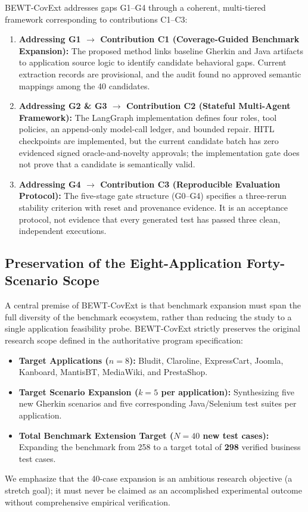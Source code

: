 \documentclass[pdflatex,sn-mathphys-num]{sn-jnl}
\begin{document}
BEWT-CovExt addresses gaps G1--G4 through a coherent, multi-tiered framework corresponding to contributions C1--C3:
\begin{enumerate}
    \item \textbf{Addressing G1 $\rightarrow$ Contribution C1 (Coverage-Guided Benchmark Expansion):} The proposed method links baseline Gherkin and Java artifacts to application source logic to identify candidate behavioral gaps. Current extraction records are provisional, and the audit found no approved semantic mappings among the 40 candidates.
    \item \textbf{Addressing G2 \& G3 $\rightarrow$ Contribution C2 (Stateful Multi-Agent Framework):} The LangGraph implementation defines four roles, tool policies, an append-only model-call ledger, and bounded repair. HITL checkpoints are implemented, but the current candidate batch has zero evidenced signed oracle-and-novelty approvals; the implementation gate does not prove that a candidate is semantically valid.
    \item \textbf{Addressing G4 $\rightarrow$ Contribution C3 (Reproducible Evaluation Protocol):} The five-stage gate structure (G0--G4) specifies a three-rerun stability criterion with reset and provenance evidence. It is an acceptance protocol, not evidence that every generated test has passed three clean, independent executions.
\end{enumerate}

\subsection{Preservation of the Eight-Application Forty-Scenario Scope}

A central premise of BEWT-CovExt is that benchmark expansion must span the full diversity of the benchmark ecosystem, rather than reducing the study to a single application feasibility probe. BEWT-CovExt strictly preserves the original research scope defined in the authoritative program specification:
\begin{itemize}
    \item \textbf{Target Applications ($n=8$):} Bludit, Claroline, ExpressCart, Joomla, Kanboard, MantisBT, MediaWiki, and PrestaShop.
    \item \textbf{Target Scenario Expansion ($k=5$ per application):} Synthesizing five new Gherkin scenarios and five corresponding Java/Selenium test suites per application.
    \item \textbf{Total Benchmark Extension Target ($N=40$ new test cases):} Expanding the benchmark from 258 to a target total of \textbf{298} verified business test cases.
\end{itemize}
We emphasize that the 40-case expansion is an ambitious research objective (a stretch goal); it must never be claimed as an accomplished experimental outcome without comprehensive empirical verification.
\end{document}
